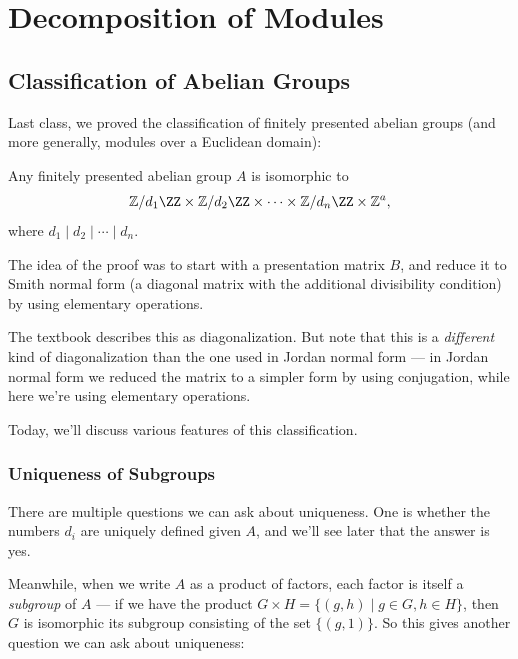 

\section{Decomposition of Modules}

\subsection{Classification of Abelian Groups}

Last class, we proved the classification of finitely presented abelian groups (and more generally, modules over a Euclidean domain):
\begin{theorem}
Any finitely presented abelian group $A$ is isomorphic to \[\mathbb{Z}/d_1\ZZ \times \mathbb{Z}/d_2\ZZ \times \cdots \times \mathbb{Z}/d_n\ZZ \times \mathbb{Z}^a,\] where $d_1 \mid d_2 \mid \cdots \mid d_n$. 
\end{theorem}
The idea of the proof was to start with a presentation matrix $B$, and reduce it to Smith normal form (a diagonal matrix with the additional divisibility condition) by using elementary operations. 

\begin{note}
The textbook describes this as diagonalization. But note that this is a \emph{different} kind of diagonalization than the one used in Jordan normal form --- in Jordan normal form we reduced the matrix to a simpler form by using conjugation, while here we're using elementary operations. 
\end{note}

Today, we'll discuss various features of this classification. 

\subsubsection{Uniqueness of Subgroups}

There are multiple questions we can ask about uniqueness. One is whether the numbers $d_i$ are uniquely defined given $A$, and we'll see later that the answer is yes. 

Meanwhile, when we write $A$ as a product of factors, each factor is itself a \emph{subgroup} of $A$ --- if we have the product $G \times H = \{(g, h) \mid g \in G, h \in H\}$, then $G$ is isomorphic its subgroup consisting of the set $\{(g, 1)\}$. So this gives another question we can ask about uniqueness:

